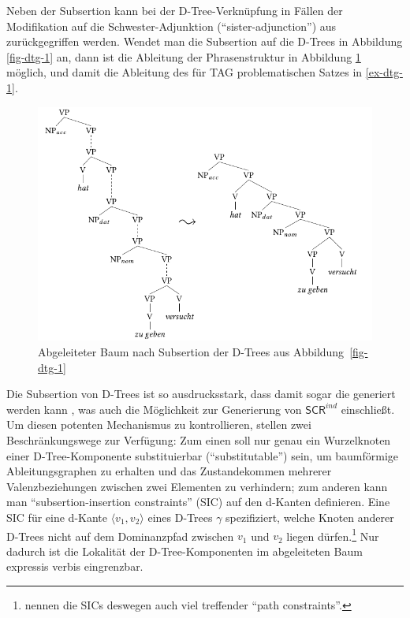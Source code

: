 Neben der Subsertion kann bei der D-Tree-Verknüpfung in Fällen der Modifikation auf die Schwester-Adjunktion ("`sister-adjunction"') aus \cite{Schabes:Shieber:94} zurückgegriffen werden. Wendet man die Subsertion auf die D-Trees in Abbildung \ref{fig-dtg-1} an, dann ist die Ableitung der Phrasenstruktur in Abbildung \ref{fig-dtg-2} möglich, und damit die Ableitung des für TAG problematischen Satzes in \ref{ex-dtg-1}.
\begin{figure}[t]
\centering
\includegraphics{graphics/abb610.pdf}
\caption{\label{fig-dtg-2}Abgeleiteter Baum nach Subsertion der D-Trees aus Abbildung~\ref{fig-dtg-1}}
\end{figure}

Die Subsertion von D-Trees ist so ausdrucksstark, dass damit sogar die  generiert werden kann \citep[Abb.~13]{Rambow:etal:01}, was auch die Möglichkeit zur Generierung von $\mathsf{SCR}^{ind}$ einschlie\ss t. Um diesen potenten Mechanismus zu kontrollieren, stellen \cite{Rambow:etal:95} zwei Beschränkungswege zur Verfügung: Zum einen soll nur genau ein Wurzelknoten einer D-Tree-Komponente substituierbar ("`substitutable"') sein, um baumförmige Ableitungsgraphen zu erhalten und das Zustandekommen mehrerer Valenzbeziehungen zwischen zwei Elementen zu verhindern; zum anderen kann man "`subsertion-insertion constraints"' (SIC) auf den d-Kanten definieren. Eine SIC für eine d-Kante $\langle v_1,v_2 \rangle$ eines D-Trees $\gamma$ spezifiziert, welche Knoten anderer D-Trees nicht auf dem Dominanzpfad zwischen $v_1$ und $v_2$ liegen dürfen.\footnote{\cite{Rambow:etal:01} nennen die SICs deswegen auch viel treffender "`path constraints"'.} Nur dadurch ist die Lokalität der D-Tree-Komponenten im abgeleiteten Baum expressis verbis eingrenzbar.


